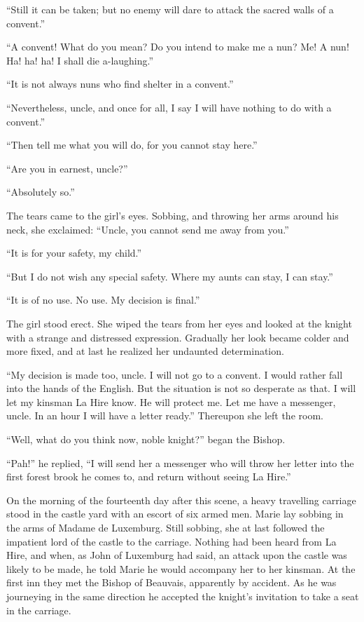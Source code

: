 ``Still it can be taken; but no enemy will dare to attack the sacred
walls of a convent.''

``A convent! What do you mean? Do you intend to make me a nun? Me! A
nun! Ha! ha! ha! I shall die a-laughing.''

``It is not always nuns who find shelter in a convent.''

``Nevertheless, uncle, and once for all, I say I will have nothing to do
with a convent.''

``Then tell me what you will do, for you cannot stay here.''

``Are you in earnest, uncle?''

``Absolutely so.''

The tears came to the girl's eyes. Sobbing, and throwing her arms around
his neck, she exclaimed: ``Uncle, you cannot send me away from you.''

``It is for your safety, my child.''

``But I do not wish any special safety. Where my aunts can stay, I can
stay.''

``It is of no use. No use. My decision is final.''

The girl stood erect. She wiped the tears from her eyes and looked at
the knight with a strange and distressed expression. Gradually her look
became colder and more fixed, and at last he realized her undaunted
determination.

``My decision is made too, uncle. I will not go to a convent. I would
rather fall into the hands of the English. But the situation is not so
desperate as that. I will let my kinsman La Hire know. He will protect
me. Let me have a messenger, uncle. In an hour I will have a letter
ready.'' Thereupon she left the room.

``Well, what do you think now, noble knight?'' began the Bishop.

``Pah!'' he replied, ``I will send her a messenger who will throw her
letter into the first forest brook he comes to, and return without
seeing La Hire.''

On the morning of the fourteenth day after this scene, a heavy
travelling carriage stood in the castle yard with an escort of six armed
men. Marie lay sobbing in the arms of Madame de Luxemburg. Still
sobbing, she at last followed the impatient lord of the castle to the
carriage. Nothing had been heard from La Hire, and when, as John of
Luxemburg had said, an attack upon the castle was likely to be made, he
told Marie he would accompany her to her kinsman. At the first inn they
met the Bishop of Beauvais, apparently by accident. As he was journeying
in the same direction he accepted the knight's invitation to take a seat
in the carriage.

